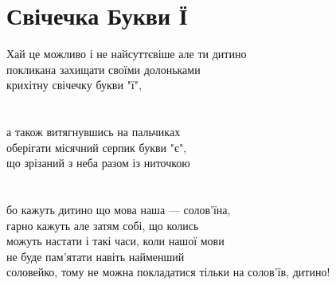 \section{Свічечка Букви Ї}

Хай це можливо і не найсуттєвіше але ти дитино\\
покликана захищати своїми долоньками\\
крихітну свічечку букви "ї",\\
\\
\\
а також витягнувшись на пальчиках\\
оберігати місячний серпик букви "є",\\
що зрізаний з неба разом із ниточкою\\
\\
\\
бо кажуть дитино що мова наша — солов'їна,\\
гарно кажуть але затям собі, що колись\\
можуть настати і такі часи, коли нашої мови\\
не буде пам'ятати навіть найменший\\
соловейко, тому не можна покладатися тільки на солов'їв, дитино!\\

\normalsize
